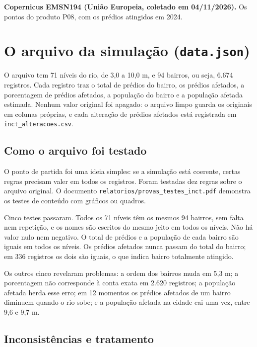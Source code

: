 \documentclass[11pt,a4paper]{article}
\newcommand{\campo}[1]{\texttt{#1}}
\begin{document}
\textbf{Copernicus EMSN194 (União Europeia, coletado em 04/11/2026).} Os pontos do produto P08, com os prédios atingidos em 2024.

\section{O arquivo da simulação (\texttt{data.json})}
\label{sec:inct}

O arquivo tem 71 níveis do rio, de 3,0 a 10,0 m, e 94 bairros, ou seja, 6.674 registros. Cada registro traz o total de prédios do bairro, os prédios afetados, a porcentagem de prédios afetados, a população do bairro e a população afetada estimada. Nenhum valor original foi apagado: o arquivo limpo guarda os originais em colunas próprias, e cada alteração de prédios afetados está registrada em \campo{inct\_alteracoes.csv}.

\subsection{Como o arquivo foi testado}

O ponto de partida foi uma ideia simples: se a simulação está coerente, certas regras precisam valer em todos os registros. Foram testadas dez regras sobre o arquivo original. O documento \campo{relatorios/provas\_testes\_inct.pdf} demonstra os testes de conteúdo com gráficos ou quadros.

Cinco testes passaram. Todos os 71 níveis têm os mesmos 94 bairros, sem falta nem repetição, e os nomes são escritos do mesmo jeito em todos os níveis. Não há valor nulo nem negativo. O total de prédios e a população de cada bairro são iguais em todos os níveis. Os prédios afetados nunca passam do total do bairro; em 336 registros os dois são iguais, o que indica bairro totalmente atingido.

Os outros cinco revelaram problemas: a ordem dos bairros muda em 5,3 m; a porcentagem não corresponde à conta exata em 2.620 registros; a população afetada herda esse erro; em 12 momentos os prédios afetados de um bairro diminuem quando o rio sobe; e a população afetada na cidade cai uma vez, entre 9,6 e 9,7 m.

\subsection{Inconsistências e tratamento}
\end{document}
